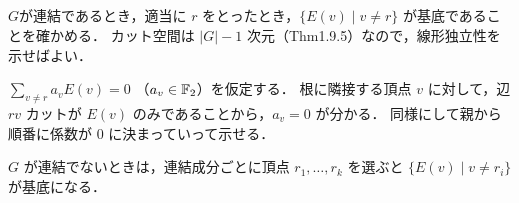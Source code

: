 \subsection{}
$G$が連結であるとき，適当に $r$ をとったとき，$\{E(v)\mid v\neq r\}$ が基底であることを確かめる．
カット空間は $|G|-1$ 次元（Thm1.9.5）なので，線形独立性を示せばよい．

$\sum_{v\neq r}a_vE(v) = 0$ （$a_v\in \mathbb{F}_2$）を仮定する．
根に隣接する頂点 $v$ に対して，辺 $rv$ カットが $E(v)$ のみであることから，$a_v = 0$ が分かる．
同様にして親から順番に係数が $0$ に決まっていって示せる．

$G$ が連結でないときは，連結成分ごとに頂点 $r_1, \ldots, r_k$ を選ぶと $\{E(v)\mid v\neq r_i\}$ が基底になる．